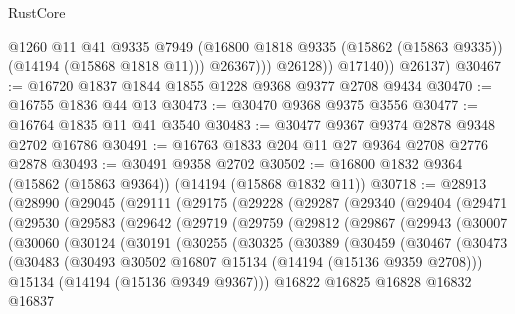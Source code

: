 \begin{lexlean}{RustCore}
\begin{coremodule}
                    @1260
                    @11
                    @41
                    @9335
                    @7949
                    (@16800 @1818 @9335 (@15862 (@15863 @9335)) (@14194 (@15868 @1818 @11)))
                    @26367)))
              @26128))
          @17140))
      @26137)
@30467 := @16720 @1837 @1844 @1855 @1228 @9368 @9377 @2708 @9434
@30470 := @16755 @1836 @44 @13
@30473 := @30470 @9368 @9375 @3556
@30477 := @16764 @1835 @11 @41 @3540
@30483 := @30477 @9367 @9374 @2878 @9348 @2702 @16786
@30491 := @16763 @1833 @204 @11 @27 @9364 @2708 @2776 @2878
@30493 := @30491 @9358 @2702
@30502 := @16800 @1832 @9364 (@15862 (@15863 @9364)) (@14194 (@15868 @1832 @11))
@30718 := @28913
    (@28990
      (@29045
        (@29111
          (@29175
            (@29228
              (@29287
                (@29340
                  (@29404
                    (@29471
                      (@29530
                        (@29583
                          (@29642
                            (@29719
                              (@29759
                                (@29812
                                  (@29867
                                    (@29943
                                      (@30007
                                        (@30060
                                          (@30124
                                            (@30191
                                              (@30255
                                                (@30325
                                                  (@30389
                                                    (@30459
                                                      (@30467
                                                        (@30473
                                                          (@30483
                                                            (@30493
                                                              @30502
                                                              @16807
                                                              @15134
                                                              (@14194 (@15136 @9359 @2708)))
                                                            @15134
                                                            (@14194 (@15136 @9349 @9367)))
                                                          @16822
                                                          @16825
                                                          @16828
                                                          @16832
                                                          @16837

\end{coremodule}
\end{lexlean}
